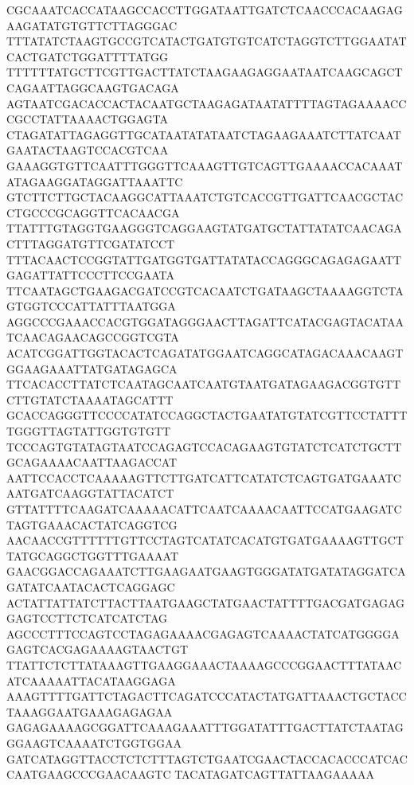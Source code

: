 CGCAAATCACCATAAGCCACCTTGGATAATTGATCTCAACCCACAAGAGAAGATATGTGTTCTTAGGGAC
TTTATATCTAAGTGCCGTCATACTGATGTGTCATCTAGGTCTTGGAATATCACTGATCTGGATTTTATGG
TTTTTTATGCTTCGTTGACTTATCTAAGAAGAGGAATAATCAAGCAGCTCAGAATTAGGCAAGTGACAGA
AGTAATCGACACCACTACAATGCTAAGAGATAATATTTTAGTAGAAAACCCGCCTATTAAAACTGGAGTA
CTAGATATTAGAGGTTGCATAATATATAATCTAGAAGAAATCTTATCAATGAATACTAAGTCCACGTCAA
GAAAGGTGTTCAATTTGGGTTCAAAGTTGTCAGTTGAAAACCACAAATATAGAAGGATAGGATTAAATTC
GTCTTCTTGCTACAAGGCATTAAATCTGTCACCGTTGATTCAACGCTACCTGCCCGCAGGTTCACAACGA
TTATTTGTAGGTGAAGGGTCAGGAAGTATGATGCTATTATATCAACAGACTTTAGGATGTTCGATATCCT
TTTACAACTCCGGTATTGATGGTGATTATATACCAGGGCAGAGAGAATTGAGATTATTCCCTTCCGAATA
TTCAATAGCTGAAGACGATCCGTCACAATCTGATAAGCTAAAAGGTCTAGTGGTCCCATTATTTAATGGA
AGGCCCGAAACCACGTGGATAGGGAACTTAGATTCATACGAGTACATAATCAACAGAACAGCCGGTCGTA
ACATCGGATTGGTACACTCAGATATGGAATCAGGCATAGACAAACAAGTGGAAGAAATTATGATAGAGCA
TTCACACCTTATCTCAATAGCAATCAATGTAATGATAGAAGACGGTGTTCTTGTATCTAAAATAGCATTT
GCACCAGGGTTCCCCATATCCAGGCTACTGAATATGTATCGTTCCTATTTTGGGTTAGTATTGGTGTGTT
TCCCAGTGTATAGTAATCCAGAGTCCACAGAAGTGTATCTCATCTGCTTGCAGAAAACAATTAAGACCAT
AATTCCACCTCAAAAAGTTCTTGATCATTCATATCTCAGTGATGAAATCAATGATCAAGGTATTACATCT
GTTATTTTCAAGATCAAAAACATTCAATCAAAACAATTCCATGAAGATCTAGTGAAACACTATCAGGTCG
AACAACCGTTTTTTGTTCCTAGTCATATCACATGTGATGAAAAGTTGCTTATGCAGGCTGGTTTGAAAAT
GAACGGACCAGAAATCTTGAAGAATGAAGTGGGATATGATATAGGATCAGATATCAATACACTCAGGAGC
ACTATTATTATCTTACTTAATGAAGCTATGAACTATTTTGACGATGAGAGGAGTCCTTCTCATCATCTAG
AGCCCTTTCCAGTCCTAGAGAAAACGAGAGTCAAAACTATCATGGGGAGAGTCACGAGAAAAGTAACTGT
TTATTCTCTTATAAAGTTGAAGGAAACTAAAAGCCCGGAACTTTATAACATCAAAAATTACATAAGGAGA
AAAGTTTTGATTCTAGACTTCAGATCCCATACTATGATTAAACTGCTACCTAAAGGAATGAAAGAGAGAA
GAGAGAAAAGCGGATTCAAAGAAATTTGGATATTTGACTTATCTAATAGGGAAGTCAAAATCTGGTGGAA
GATCATAGGTTACCTCTCTTTAGTCTGAATCGAACTACCACACCCATCACCAATGAAGCCCGAACAAGTC
TACATAGATCAGTTATTAAGAAAAA


